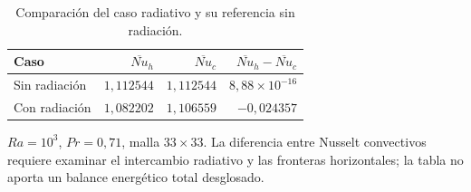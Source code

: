 \begin{table}[htbp]
\centering
\caption{Comparación del caso radiativo y su referencia sin radiación.}
\label{tab:res_cavidad_radiacion}
\small
\setlength{\tabcolsep}{5pt}
\begin{tabular}{lrrr}
\toprule
Caso & $\overline{Nu}_h$ & $\overline{Nu}_c$ & $\overline{Nu}_h-\overline{Nu}_c$ \\
\midrule
Sin radiación & $1{,}112544$ & $1{,}112544$ & $8{,}88\times10^{-16}$ \\
Con radiación & $1{,}082202$ & $1{,}106559$ & $-0{,}024357$ \\
\bottomrule
\end{tabular}
\par\vspace{3pt}
\begin{minipage}{0.98\textwidth}\footnotesize
$Ra=10^3$, $Pr=0{,}71$, malla $33\times33$. La diferencia entre Nusselt convectivos requiere examinar el intercambio radiativo y las fronteras horizontales; la tabla no aporta un balance energético total desglosado.
\end{minipage}
\end{table}
